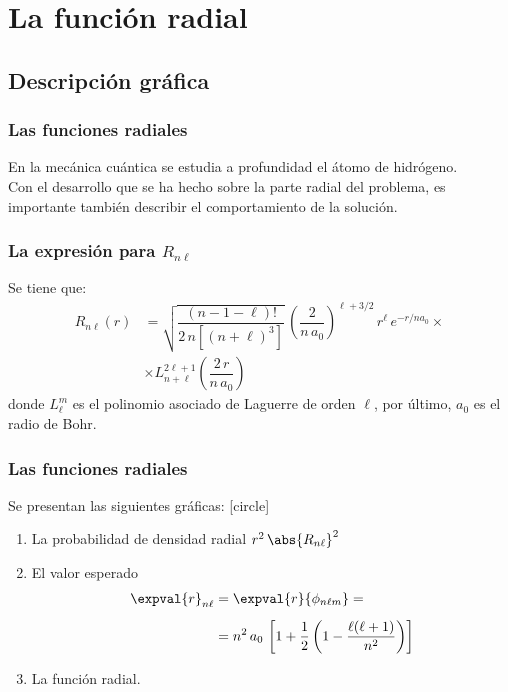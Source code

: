 \section{La función radial}
\subsection{Descripción gráfica}
\begin{frame}
\frametitle{Las funciones radiales}
En la mecánica cuántica se estudia a profundidad el átomo de hidrógeno.
\\
\bigskip
\pause
Con el desarrollo que se ha hecho sobre la parte radial del problema, es importante también describir el comportamiento de la solución.
\end{frame}
\begin{frame}
\frametitle{La expresión para $R_{n \ell}$}
Se tiene que:
\begin{align*}
R_{n \ell} (r) &= \sqrt{\dfrac{(n - 1 -\ell)!}{2 \, n [(n + \ell)^{3}]}} \, \left( \dfrac{2}{n \, a_{0}} \right)^{\ell+3/2} \, r^{\ell} \, e^{-r/n a_{0}} \times \\[0.5em]
&\times L_{n+\ell}^{2 \ell+1} \left( \dfrac{2 \, r}{n \, a_{0}} \right)
\end{align*}
donde $L_{\ell}^{m}$ es el polinomio asociado de Laguerre de orden $\ell$, por último, $a_{0}$ es el radio de Bohr.
\end{frame}
\begin{frame}
\frametitle{Las funciones radiales}
Se presentan las siguientes gráficas:
[circle]
\begin{enumerate}[<+->]
\item La probabilidad de densidad radial $r^{2} \, \abs{R_{n \ell}}^{2}$
\item El valor esperado
\begin{align*}
\expval{r}_{n \ell} &= \expval{r}{\phi_{n \ell m}} = \\[0.5em]
&= n^{2} \, a_{0} \, \left[ 1 + \dfrac{1}{2} \left( 1 - \dfrac{\ell (\ell + 1)}{n^{2}} \right) \right]
\end{align*}
\item La función radial.
\end{enumerate}
\end{frame}
